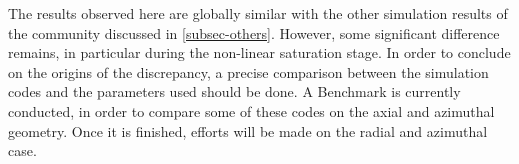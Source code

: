   
  The results observed here are globally similar with the other simulation results of the community discussed in \cref{subsec-others}.
  However, some significant difference remains, in particular during the non-linear saturation stage.
  In order to conclude on the origins of the discrepancy, a precise comparison between the simulation codes and the parameters used should be done.
  A Benchmark is currently conducted, in order to compare some of these codes on the axial and azimuthal geometry.
  Once it is finished, efforts will be made on the radial and azimuthal case.
  
  
